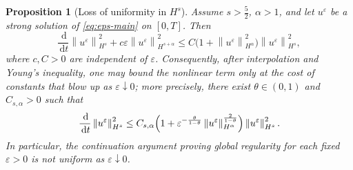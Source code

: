 \documentclass[11pt]{article}
\newtheorem{proposition}[theorem]{Proposition}
\theoremstyle{definition}
\theoremstyle{remark}
\newcommand{\dd}{\,\mathrm{d}}
\newcommand{\norm}[1]{\left\lVert #1\right\rVert}
\begin{document}
\begin{proposition}[Loss of uniformity in $H^s$]\label{prop:nonuniform-Hs}
Assume $s>\frac52$, $\alpha>1$, and let $u^\varepsilon$ be a strong solution of \eqref{eq:eps-main} on $[0,T]$. Then
\begin{equation}\label{eq:eps-Hs}
\frac{\dd}{\dd t}\norm{u^\varepsilon}_{H^s}^2
+c\varepsilon\norm{u^\varepsilon}_{H^{s+\alpha}}^2
\le C\bigl(1+\norm{u^\varepsilon}_{H^\alpha}^2\bigr)\norm{u^\varepsilon}_{H^s}^2,
\end{equation}
where $c,C>0$ are independent of $\varepsilon$. Consequently, after interpolation and Young's inequality, one may bound the nonlinear term only at the cost of constants that blow up as $\varepsilon\downarrow0$; more precisely, there exist $\theta\in(0,1)$ and $C_{s,\alpha}>0$ such that
\begin{equation}\label{eq:eps-Hs-degenerate}
\frac{\dd}{\dd t}\norm{u^\varepsilon}_{H^s}^2
\le C_{s,\alpha}\Bigl(1+\varepsilon^{-\frac{\theta}{1-\theta}}\norm{u^\varepsilon}_{H^\alpha}^{\frac{2}{1-\theta}}\Bigr)\norm{u^\varepsilon}_{H^s}^2.
\end{equation}
In particular, the continuation argument proving global regularity for each fixed $\varepsilon>0$ is not uniform as $\varepsilon\downarrow0$.
\end{proposition}
\end{document}
